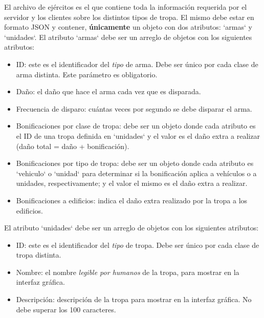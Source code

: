 \documentclass[titlepage,a4paper,12pt]{article}
\begin{document}
\begin{itemize}
El archivo de ejércitos es el que contiene toda la información requerida por el servidor y los clientes sobre los distintos tipos de tropa. El mismo debe estar en formato JSON y contener, \textbf{únicamente} un objeto con 
dos atributos: `armas` y `unidades`.  El atributo `armas` debe ser un arreglo de objetos con los siguientes atributos:


\begin{itemize}

\item ID: este es el identificador del \textit{tipo} de arma. Debe ser único por cada clase de arma distinta. Este parámetro es obligatorio.

\item Daño: el daño que hace el arma cada vez que es disparada.


\item Frecuencia de disparo: cuántas veces por segundo se debe disparar el arma.

\item Bonificaciones por clase de tropa: debe ser un objeto donde cada atributo es el ID de una tropa definida en `unidades` y el valor es el daño extra a realizar (daño total = daño + bonificación).

\item Bonificaciones por tipo de tropa: debe ser un objeto donde cada atributo es `vehiculo` o `unidad` para determinar si la bonificación aplica a vehículos o a unidades, respectivamente; y el valor el mismo es el daño extra a realizar.

\item Bonificaciones a edificios: indica el daño extra realizado por la tropa a los edificios.

\end{itemize}

El atributo `unidades` debe ser un arreglo de objetos con los siguientes atributos:  

\begin{itemize}

\item ID: este es el identificador del \textit{tipo} de tropa. Debe ser único por cada clase de tropa distinta.

\item Nombre: el nombre \textit{legible por humanos} de la tropa, para mostrar en la interfaz gráfica.

\item Descripción: descripción de la tropa para mostrar en la interfaz gráfica. No debe superar los 100 caracteres.


\end{itemize}
\end{itemize}
\end{document}

